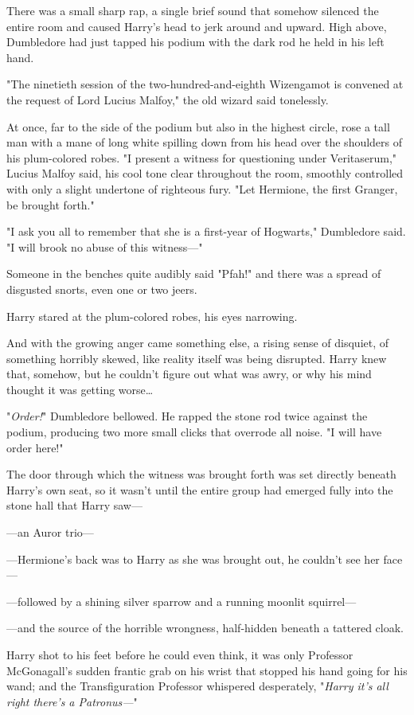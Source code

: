 There was a small sharp rap, a single brief sound that somehow silenced the 
entire room and caused Harry's head to jerk around and upward. High above, 
Dumbledore had just tapped his podium with the dark rod he held in his left 
hand.

"The ninetieth session of the two-hundred-and-eighth Wizengamot is convened at 
the request of Lord Lucius Malfoy," the old wizard said tonelessly.

At once, far to the side of the podium but also in the highest circle, rose a 
tall man with a mane of long white spilling down from his head over the 
shoulders of his plum-colored robes. "I present a witness for questioning under 
Veritaserum," Lucius Malfoy said, his cool tone clear throughout the room, 
smoothly controlled with only a slight undertone of righteous fury. "Let 
Hermione, the first Granger, be brought forth."

"I ask you all to remember that she is a first-year of Hogwarts," Dumbledore 
said. "I will brook no abuse of this witness---"

Someone in the benches quite audibly said "Pfah!" and there was a spread of 
disgusted snorts, even one or two jeers.

Harry stared at the plum-colored robes, his eyes narrowing.

And with the growing anger came something else, a rising sense of disquiet, of 
something horribly skewed, like reality itself was being disrupted. Harry knew 
that, somehow, but he couldn't figure out what was awry, or why his mind 
thought it was getting worse{\ldots}

"\emph{Order!}" Dumbledore bellowed. He rapped the stone rod twice against the 
podium, producing two more small clicks that overrode all noise. "I will have 
order here!"

The door through which the witness was brought forth was set directly beneath 
Harry's own seat, so it wasn't until the entire group had emerged fully into 
the stone hall that Harry saw---

---an Auror trio---

---Hermione's back was to Harry as she was brought out, he couldn't see her 
face---

---followed by a shining silver sparrow and a running moonlit squirrel---

---and the source of the horrible wrongness, half-hidden beneath a tattered 
cloak.

Harry shot to his feet before he could even think, it was only Professor 
McGonagall's sudden frantic grab on his wrist that stopped his hand going for 
his wand; and the Transfiguration Professor whispered desperately, "\emph{Harry 
it's all right there's a Patronus---}"

